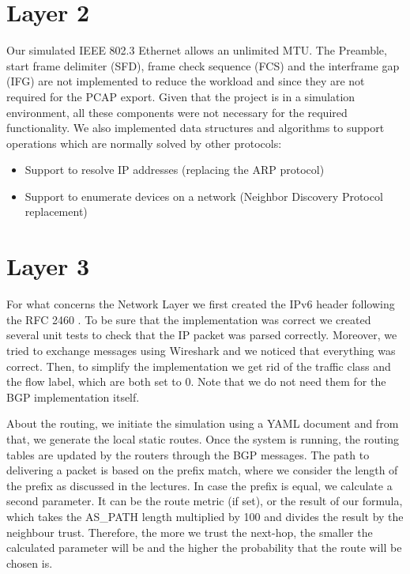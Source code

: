 \section{Layer 2}\label{layer2}
Our simulated IEEE 802.3 Ethernet allows an unlimited MTU.
The Preamble, start frame delimiter (SFD), frame check sequence (FCS) and the interframe gap (IFG) are not implemented to reduce the workload and since they are not required for the PCAP export.
Given that the project is in a simulation environment, all these components were not necessary for the required functionality.\newline
We also implemented data structures and algorithms to support operations which are normally solved by other protocols:
\begin{itemize}
 \item Support to resolve IP addresses (replacing the ARP protocol)
 \item Support to enumerate devices on a network (Neighbor Discovery Protocol replacement)
\end{itemize}


\section{Layer 3}\label{layer3}
For what concerns the Network Layer we first created the IPv6 header following the RFC 2460 \cite{rfc2460}.\newline
To be sure that the implementation was correct we created several unit tests to check that the IP packet was parsed correctly.
Moreover, we tried to exchange messages using Wireshark and we noticed that everything was correct.\newline
Then, to simplify the implementation we get rid of the traffic class and the flow label, which are both set to 0.
Note that we do not need them for the BGP implementation itself.
\par About the routing, we initiate the simulation using a YAML document and from that, we generate the local static routes.\newline
Once the system is running, the routing tables are updated by the routers through the BGP messages.
The path to delivering a packet is based on the prefix match, where we consider the length of the prefix as discussed in the lectures.\newline
In case the prefix is equal, we calculate a second parameter.
It can be the route metric (if set), or the result of our formula, which takes the AS\_PATH length multiplied by 100 and divides the result by the neighbour trust.
Therefore, the more we trust the next-hop, the smaller the calculated parameter will be and the higher the probability that the route will be chosen is.

